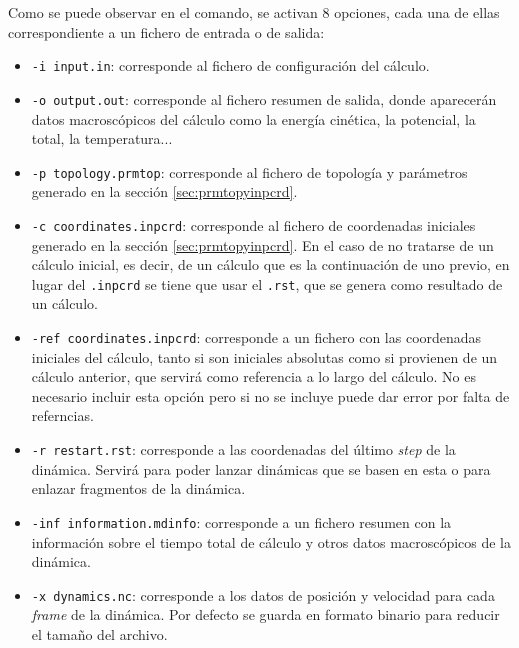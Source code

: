             Como se puede observar en el comando, se activan 8 opciones, cada una de ellas correspondiente a un fichero de entrada o de salida:
            \begin{itemize}
                \item \texttt{-i input.in}: corresponde al fichero de configuración del cálculo.
                \item \texttt{-o output.out}: corresponde al fichero resumen de salida, donde aparecerán datos macroscópicos del cálculo como la energía cinética, la potencial, la total, la temperatura...
                \item \texttt{-p topology.prmtop}: corresponde al fichero de topología y parámetros generado en la sección \ref{sec:prmtopyinpcrd}.
                \item \texttt{-c coordinates.inpcrd}: corresponde al fichero de coordenadas iniciales generado en la sección \ref{sec:prmtopyinpcrd}. En el caso de no tratarse de un cálculo inicial, es decir, de un cálculo que es la continuación de uno previo, en lugar del \texttt{.inpcrd} se tiene que usar el \texttt{.rst}, que se genera como resultado de un cálculo.
                \item \texttt{-ref coordinates.inpcrd}: corresponde a un fichero con las coordenadas iniciales del cálculo, tanto si son iniciales absolutas como si provienen de un cálculo anterior, que servirá como referencia a lo largo del cálculo. No es necesario incluir esta opción pero si no se incluye puede dar error por falta de referncias.
                \item \texttt{-r restart.rst}: corresponde a las coordenadas del último \textit{step} de la dinámica. Servirá para poder lanzar dinámicas que se basen en esta o para enlazar fragmentos de la dinámica.
                \item \texttt{-inf information.mdinfo}: corresponde a un fichero resumen con la información sobre el tiempo total de cálculo y otros datos macroscópicos de la dinámica.
                \item \texttt{-x dynamics.nc}: corresponde a los datos de posición y velocidad para cada \textit{frame} de la dinámica. Por defecto se guarda en formato binario para reducir el tamaño del archivo. 
            \end{itemize}
